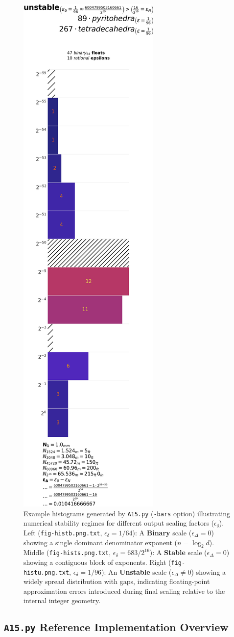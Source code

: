 \documentclass[10pt]{article}
\begin{document}
\begin{figure}[!htb]
    \includegraphics[width=.325\textwidth]{fig-histu}%
    \caption{Example histograms generated by \texttt{A15.py} (\texttt{-bars} option) illustrating numerical stability regimes for different output scaling factors ($\epsilon_\delta$). Left (\texttt{fig-histb.png.txt}, $\epsilon_\delta=1/64$): A \textbf{Binary} scale ($\epsilon_\Delta=0$) showing a single dominant denominator exponent ($n = \log_2 d$). Middle (\texttt{fig-hists.png.txt}, $\epsilon_\delta=683/2^{16}$): A \textbf{Stable} scale ($\epsilon_\Delta=0$) showing a contiguous block of exponents. Right (\texttt{fig-histu.png.txt}, $\epsilon_\delta=1/96$): An \textbf{Unstable} scale ($\epsilon_\Delta \neq 0$) showing a widely spread distribution with gaps, indicating floating-point approximation errors introduced during final scaling relative to the internal integer geometry.}
    \label{fig-hist}
\end{figure}

\subsection{\texttt{A15.py} Reference Implementation Overview}\label{subsec-implementation-a15py}
\end{document}
